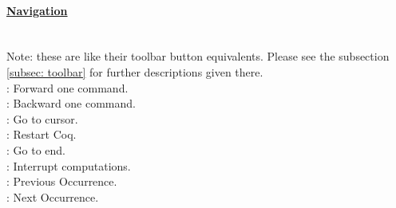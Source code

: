 \paragraph{\underline{Navigation}}
~\\
Note: these are like their toolbar button equivalents. 
Please see the subsection \ref{subsec: toolbar} for further descriptions given there. 
\\
 : Forward one command. 
\\ 
 : Backward one command. 
\\
 : Go to cursor. 
\\
 : Restart Coq. 
\\
 : Go to end. 
\\
 : Interrupt computations. 
\\
 : Previous Occurrence. 
\\
 : Next Occurrence. 




	
~\\
